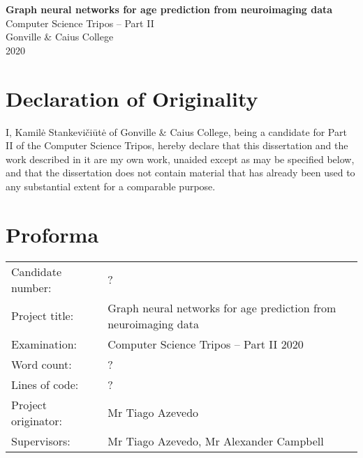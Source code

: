 \documentclass[12pt,a4paper,twoside, openright, hidelinks]{report}
\begin{document}



\pagestyle{empty}


\vspace*{60mm}
\begin{center}
\LARGE
\textbf{Graph neural networks for age prediction from neuroimaging data} \\[5mm]
\large
Computer Science Tripos -- Part II \\[5mm]
Gonville \& Caius College \\[5mm]
2020
\end{center}


\pagestyle{plain}
\newpage
\chapter*{Declaration of Originality}

I, Kamilė Stankevičiūtė of Gonville \& Caius College, being a candidate for Part II of the Computer Science Tripos, hereby declare that this dissertation and the work described in it are my own work, unaided except as may be specified below, and that the dissertation does not contain material that has already been used to any substantial extent for a comparable purpose.

\bigskip
{}

\medskip
{}

\chapter*{Proforma}

\begin{tabular}{ll}
Candidate number:   & ?                  \\
Project title:      & Graph neural networks for age prediction from neuroimaging data \\
Examination:        & Computer Science Tripos -- Part II 2020 \\
Word count:         & ? \footnotemark[1] \\
Lines of code:      & ?  \\
Project originator: & Mr Tiago Azevedo                        \\
Supervisors:        & Mr Tiago Azevedo, Mr Alexander Campbell \\ 
\end{tabular}
\end{document}
